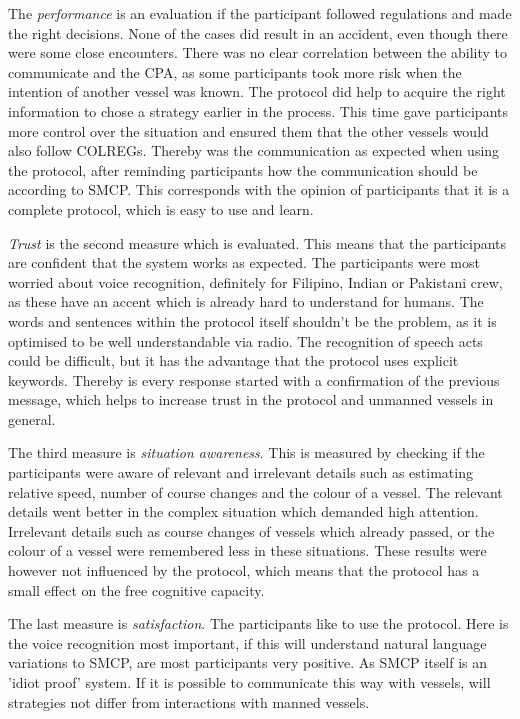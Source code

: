 The \emph{performance} is an evaluation if the participant followed regulations and made the right decisions. None of the cases did result in an accident, even though there were some close encounters. There was no clear correlation between the ability to communicate and the \acf{CPA}, as some participants took more risk when the intention of another vessel was known. The protocol did help to acquire the right information to chose a strategy earlier in the process. This time gave participants more control over the situation and ensured them that the other vessels would also follow \ac{COLREGs}.
Thereby was the communication as expected when using the protocol, after reminding participants how the communication should be according to \ac{SMCP}. This corresponds with the opinion of participants that it is a complete protocol, which is easy to use and learn.

\emph{Trust} is the second measure which is evaluated. This means that the participants are confident that the system works as expected. The participants were most worried about voice recognition, definitely for Filipino, Indian or Pakistani crew, as these have an accent which is already hard to understand for humans. The words and sentences within the protocol itself shouldn't be the problem, as it is optimised to be well understandable via radio. The recognition of speech acts could be difficult, but it has the advantage that the protocol uses explicit keywords. Thereby is every response started with a confirmation of the previous message, which helps to increase trust in the protocol and unmanned vessels in general.

The third measure is \emph{situation awareness}. This is measured by checking if the participants were aware of relevant and irrelevant details such as estimating relative speed, number of course changes and the colour of a vessel. The relevant details went better in the complex situation which demanded high attention. Irrelevant details such as course changes of vessels which already passed, or the colour of a vessel were remembered less in these situations. These results were however not influenced by the protocol, which means that the protocol has a small effect on the free cognitive capacity.

The last measure is \emph{satisfaction}. The participants like to use the protocol. Here is the voice recognition most important, if this will understand natural language variations to \ac{SMCP}, are most participants very positive. As \ac{SMCP} itself is an 'idiot proof' system. If it is possible to communicate this way with vessels, will strategies not differ from interactions with manned vessels.

